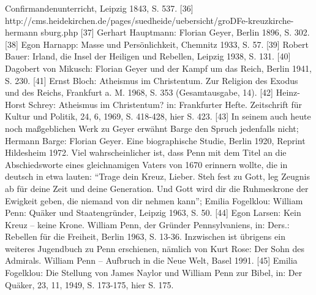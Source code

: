 Confirmandenunterricht, Leipzig 1843, S. 537.
[36]
http://cms.heidekirchen.de/pages/suedheide/uebersicht/groDFe-kreuzkirche-hermann
sburg.php
[37] Gerhart Hauptmann: Florian Geyer, Berlin 1896, S. 302.
[38] Egon Harnapp: Masse und Persönlichkeit, Chemnitz 1933, S. 57.
[39] Robert Bauer: Irland, die Insel der Heiligen und Rebellen, Leipzig 1938, S.
131.
[40] Dagobert von Mikusch: Florian Geyer und der Kampf um das Reich, Berlin
1941, S. 230.
[41] Ernst Bloch: Atheismus im Christentum. Zur Religion des Exodus und des
Reichs, Frankfurt a. M. 1968, S. 353 (Gesamtausgabe, 14).
[42] Heinz-Horst Schrey: Atheismus im Christentum? in: Frankfurter Hefte.
Zeitschrift für Kultur und Politik, 24, 6, 1969, S. 418-428, hier S. 423.
[43] In seinem auch heute noch maßgeblichen Werk zu Geyer erwähnt Barge den
Spruch jedenfalls nicht; Hermann Barge: Florian Geyer. Eine biographische
Studie, Berlin 1920, Reprint Hildesheim 1972. Viel wahrscheinlicher ist, dass
Penn mit dem Titel an die Abschiedsworte eines gleichnamigen Vaters von 1670
erinnern wollte, die in deutsch in etwa lauten: "`Trage dein Kreuz, Lieber. Steh
fest zu Gott, leg Zeugnis ab für deine Zeit und deine Generation. Und Gott wird
dir die Ruhmeskrone der Ewigkeit geben, die niemand von dir nehmen kann"';
Emilia Fogelklou: William Penn: Quäker und Staatengründer, Leipzig 1963, S. 50.
[44] Egon Larsen: Kein Kreuz – keine Krone. William Penn, der Gründer
Pennsylvaniens, in: Ders.: Rebellen für die Freiheit, Berlin 1963, S. 13-36.
Inzwischen ist übrigens ein weiteres Jugendbuch zu Penn erschienen, nämlich von
Kurt Rose: Der Sohn des Admirals. William Penn – Aufbruch in die Neue Welt,
Basel 1991.
[45] Emilia Fogelklou: Die Stellung von James Naylor und William Penn zur Bibel,
in: Der Quäker, 23, 11, 1949, S. 173-175, hier S. 175.